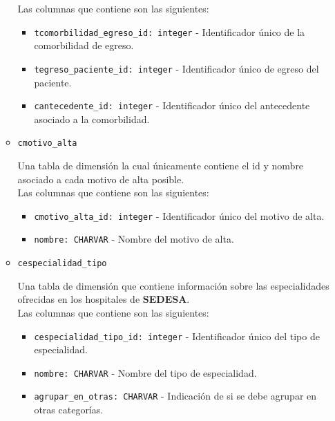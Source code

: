 \begin{itemize}
\begin{itemize}
            Las columnas que contiene son las siguientes:
            \begin{itemize}
                \item \texttt{tcomorbilidad\_egreso\_id: integer} - Identificador único de la comorbilidad de egreso.
                
                \item \texttt{tegreso\_paciente\_id: integer} - Identificador único de egreso del paciente.
                
                \item \texttt{cantecedente\_id: integer} - Identificador único del antecedente asociado a la comorbilidad.
            \end{itemize}
            
            
            \item \texttt{cmotivo\_alta}

            Una tabla de dimensión la cual únicamente contiene el id y nombre asociado a cada motivo de alta posible.\\

            Las columnas que contiene son las siguientes:
            \begin{itemize}
                \item \texttt{cmotivo\_alta\_id: integer} - Identificador único del motivo de alta.
                
                \item \texttt{nombre: CHARVAR} - Nombre del motivo de alta.
            \end{itemize}
            
            \item \texttt{cespecialidad\_tipo}

            Una tabla de dimensión que contiene información sobre las especialidades ofrecidas en los hospitales de \textbf{SEDESA}.\\

            Las columnas que contiene son las siguientes:
            \begin{itemize}
                \item \texttt{cespecialidad\_tipo\_id: integer} - Identificador único del tipo de especialidad.
                
                \item \texttt{nombre: CHARVAR} - Nombre del tipo de especialidad.
                
                \item \texttt{agrupar\_en\_otras: CHARVAR} - Indicación de si se debe agrupar en otras categorías.
            \end{itemize}

        \end{itemize}
    
\end{itemize}

